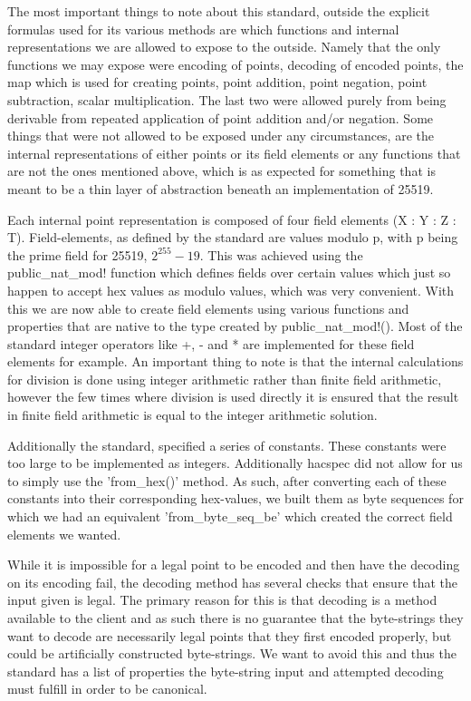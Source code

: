 \documentclass{article}
\begin{document}
The most important things to note about this standard, outside the explicit formulas used for its various methods are which functions and internal representations we are allowed to expose to the outside. Namely that the only functions we may expose were encoding of points, decoding of encoded points, the map which is used for creating points, point addition, point negation, point subtraction, scalar multiplication. The last two were allowed purely from being derivable from repeated application of point addition and/or negation. Some things that were not allowed to be exposed under any circumstances, are the internal representations of either points or its field elements or any functions that are not the ones mentioned above, which is as expected for something that is meant to be a thin layer of abstraction beneath an implementation of 25519.

Each internal point representation is composed of four field elements (X : Y : Z : T). Field-elements, as defined by the standard are values modulo p, with p being the prime field for 25519, $2^{255} - 19$. This was achieved using the public\_nat\_mod! function which defines fields over certain values which just so happen to accept hex values as modulo values, which was very convenient. With this we are now able to create field elements using various functions and properties that are native to the type created by public\_nat\_mod!(). Most of the standard integer operators like +, - and * are implemented for these field elements for example. An important thing to note is that the internal calculations for division is done using integer arithmetic rather than finite field arithmetic, however the few times where division is used directly it is ensured that the result in finite field arithmetic is equal to the integer arithmetic solution. 

Additionally the standard, specified a series of constants. These constants were too large to be implemented as integers. Additionally hacspec did not allow for us to simply use the 'from\_hex()' method. As such, after converting each of these constants into their corresponding hex-values, we built them as byte sequences for which we had an equivalent 'from\_byte\_seq\_be' which created the correct field elements we wanted. 

While it is impossible for a legal point to be encoded and then have the decoding on its encoding fail, the decoding method has several checks that ensure that the input given is legal. The primary reason for this is that decoding is a method available to the client and as such there is no guarantee that the byte-strings they want to decode are necessarily legal points that they first encoded properly, but could be artificially constructed byte-strings. We want to avoid this and thus the standard has a list of properties the byte-string input and attempted decoding must fulfill in order to be canonical. 
\end{document}
